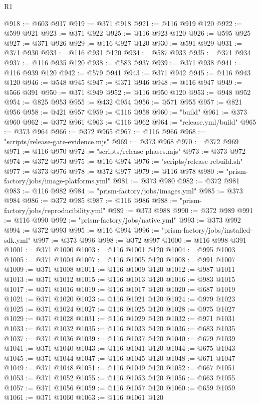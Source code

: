 \begin{lexlean}{R1}
\begin{coremodule}
@918 := @603 @917
@919 := @371 @918
@921 := @116 @919 @120
@922 := @599 @921
@923 := @371 @922
@925 := @116 @923 @120
@926 := @595 @925
@927 := @371 @926
@929 := @116 @927 @120
@930 := @591 @929
@931 := @371 @930
@933 := @116 @931 @120
@934 := @587 @933
@935 := @371 @934
@937 := @116 @935 @120
@938 := @583 @937
@939 := @371 @938
@941 := @116 @939 @120
@942 := @579 @941
@943 := @371 @942
@945 := @116 @943 @120
@946 := @548 @945
@947 := @371 @946
@948 := @116 @947
@949 := @566 @391
@950 := @371 @949
@952 := @116 @950 @120
@953 := @948 @952
@954 := @825 @953
@955 := @432 @954
@956 := @571 @955
@957 := @821 @956
@958 := @421 @957
@959 := @116 @958
@960 := "build"
@961 := @373 @960
@962 := @372 @961
@963 := @116 @962
@964 := "release.yml/build"
@965 := @373 @964
@966 := @372 @965
@967 := @116 @966
@968 := "scripts/release-gate-evidence.mjs"
@969 := @373 @968
@970 := @372 @969
@971 := @116 @970
@972 := "scripts/release-phases.mjs"
@973 := @373 @972
@974 := @372 @973
@975 := @116 @974
@976 := "scripts/release-rebuild.sh"
@977 := @373 @976
@978 := @372 @977
@979 := @116 @978
@980 := "prism-factory/jobs/image-platforms.yml"
@981 := @373 @980
@982 := @372 @981
@983 := @116 @982
@984 := "prism-factory/jobs/images.yml"
@985 := @373 @984
@986 := @372 @985
@987 := @116 @986
@988 := "prism-factory/jobs/reproducibility.yml"
@989 := @373 @988
@990 := @372 @989
@991 := @116 @990
@992 := "prism-factory/jobs/native.yml"
@993 := @373 @992
@994 := @372 @993
@995 := @116 @994
@996 := "prism-factory/jobs/installed-sdk.yml"
@997 := @373 @996
@998 := @372 @997
@1000 := @116 @998 @391
@1001 := @371 @1000
@1003 := @116 @1001 @120
@1004 := @995 @1003
@1005 := @371 @1004
@1007 := @116 @1005 @120
@1008 := @991 @1007
@1009 := @371 @1008
@1011 := @116 @1009 @120
@1012 := @987 @1011
@1013 := @371 @1012
@1015 := @116 @1013 @120
@1016 := @983 @1015
@1017 := @371 @1016
@1019 := @116 @1017 @120
@1020 := @687 @1019
@1021 := @371 @1020
@1023 := @116 @1021 @120
@1024 := @979 @1023
@1025 := @371 @1024
@1027 := @116 @1025 @120
@1028 := @975 @1027
@1029 := @371 @1028
@1031 := @116 @1029 @120
@1032 := @971 @1031
@1033 := @371 @1032
@1035 := @116 @1033 @120
@1036 := @683 @1035
@1037 := @371 @1036
@1039 := @116 @1037 @120
@1040 := @679 @1039
@1041 := @371 @1040
@1043 := @116 @1041 @120
@1044 := @675 @1043
@1045 := @371 @1044
@1047 := @116 @1045 @120
@1048 := @671 @1047
@1049 := @371 @1048
@1051 := @116 @1049 @120
@1052 := @667 @1051
@1053 := @371 @1052
@1055 := @116 @1053 @120
@1056 := @663 @1055
@1057 := @371 @1056
@1059 := @116 @1057 @120
@1060 := @659 @1059
@1061 := @371 @1060
@1063 := @116 @1061 @120

\end{coremodule}
\end{lexlean}
